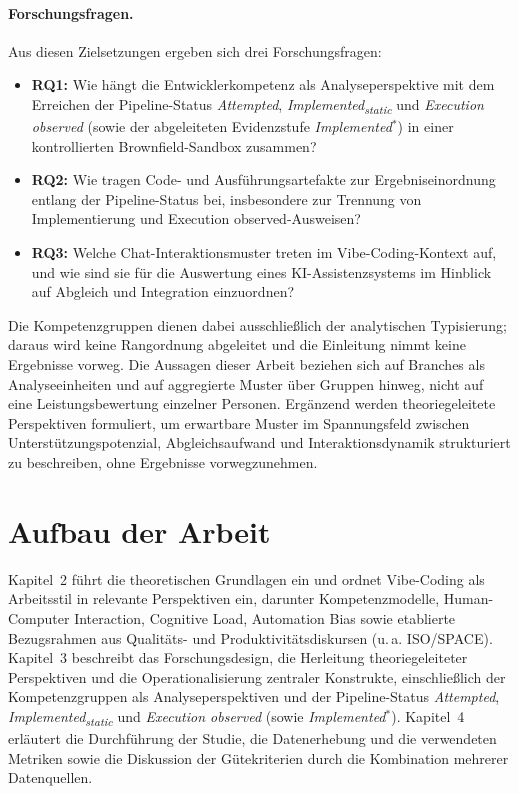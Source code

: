 \paragraph{Forschungsfragen.}
Aus diesen Zielsetzungen ergeben sich drei Forschungsfragen:
\begin{itemize}
    \item  \textbf{RQ1:} Wie hängt die Entwicklerkompetenz als Analyseperspektive mit dem Erreichen der Pipeline-Status  \textit{Attempted},  \textit{Implemented\textsubscript{static}} und  \textit{Execution observed} (sowie der abgeleiteten Evidenzstufe  \textit{Implemented$^\ast$}) in einer kontrollierten Brownfield-Sandbox zusammen?
    \item  \textbf{RQ2:} Wie tragen Code- und Ausführungsartefakte zur Ergebniseinordnung entlang der Pipeline-Status bei, insbesondere zur Trennung von Implementierung und Execution observed-Ausweisen?
    \item  \textbf{RQ3:} Welche Chat-Interaktionsmuster treten im Vibe-Coding-Kontext auf, und wie sind sie für die Auswertung eines KI-Assistenzsystems im Hinblick auf Abgleich und Integration einzuordnen?
\end{itemize}
Die Kompetenzgruppen dienen dabei ausschließlich der analytischen Typisierung; daraus wird keine Rangordnung abgeleitet und die Einleitung nimmt keine Ergebnisse vorweg.
Die Aussagen dieser Arbeit beziehen sich auf Branches als Analyseeinheiten und auf aggregierte Muster über Gruppen hinweg, nicht auf eine Leistungsbewertung einzelner Personen.
Ergänzend werden theoriegeleitete Perspektiven formuliert, um erwartbare Muster im Spannungsfeld zwischen Unterstützungspotenzial, Abgleichsaufwand und Interaktionsdynamik strukturiert zu beschreiben, ohne Ergebnisse vorwegzunehmen.

\section{Aufbau der Arbeit}
Kapitel~2 führt die theoretischen Grundlagen ein und ordnet Vibe-Coding als Arbeitsstil in relevante Perspektiven ein, darunter Kompetenzmodelle, Human-Computer Interaction, Cognitive Load, Automation Bias sowie etablierte Bezugsrahmen aus Qualitäts- und Produktivitätsdiskursen (u.\,a. ISO/SPACE).
Kapitel~3 beschreibt das Forschungsdesign, die Herleitung theoriegeleiteter Perspektiven und die Operationalisierung zentraler Konstrukte, einschließlich der Kompetenzgruppen als Analyseperspektiven und der Pipeline-Status  \textit{Attempted},  \textit{Implemented\textsubscript{static}} und  \textit{Execution observed} (sowie  \textit{Implemented$^\ast$}).
Kapitel~4 erläutert die Durchführung der Studie, die Datenerhebung und die verwendeten Metriken sowie die Diskussion der Gütekriterien durch die Kombination mehrerer Datenquellen.

